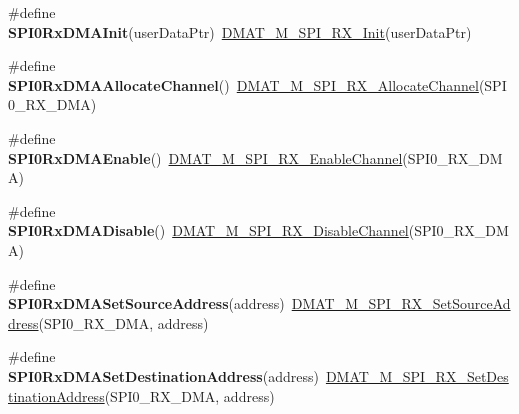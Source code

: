 \begin{DoxyCompactItemize}
\item 
\hypertarget{group___func_ala_gae401f088b3d05a165441ed135989a7ac}{\#define {\bfseries S\-P\-I0\-Rx\-D\-M\-A\-Init}(user\-Data\-Ptr)~\hyperlink{group___d_m_a_t___m___s_p_i___r_x__module_gae1749563cbec6c79815508b3c37ba827}{D\-M\-A\-T\-\_\-\-M\-\_\-\-S\-P\-I\-\_\-\-R\-X\-\_\-\-Init}(user\-Data\-Ptr)}\label{group___func_ala_gae401f088b3d05a165441ed135989a7ac}

\item 
\hypertarget{group___func_ala_gad314839d14b157f6bfe18c20bd9b6ee5}{\#define {\bfseries S\-P\-I0\-Rx\-D\-M\-A\-Allocate\-Channel}()~\hyperlink{group___d_m_a_t___m___s_p_i___r_x__module_ga94c354d7c7c0b56a1aed784fcb0e3d77}{D\-M\-A\-T\-\_\-\-M\-\_\-\-S\-P\-I\-\_\-\-R\-X\-\_\-\-Allocate\-Channel}(S\-P\-I0\-\_\-\-R\-X\-\_\-\-D\-M\-A)}\label{group___func_ala_gad314839d14b157f6bfe18c20bd9b6ee5}

\item 
\hypertarget{group___func_ala_gab32e02a52a5a9bf1bfa62dc8de40ed0e}{\#define {\bfseries S\-P\-I0\-Rx\-D\-M\-A\-Enable}()~\hyperlink{group___d_m_a_t___m___s_p_i___r_x__module_gafc57e74b4003c05c870480ab0c3a8432}{D\-M\-A\-T\-\_\-\-M\-\_\-\-S\-P\-I\-\_\-\-R\-X\-\_\-\-Enable\-Channel}(S\-P\-I0\-\_\-\-R\-X\-\_\-\-D\-M\-A)}\label{group___func_ala_gab32e02a52a5a9bf1bfa62dc8de40ed0e}

\item 
\hypertarget{group___func_ala_ga8cdf69e7e5f8189291ca4ce68e8245ee}{\#define {\bfseries S\-P\-I0\-Rx\-D\-M\-A\-Disable}()~\hyperlink{group___d_m_a_t___m___s_p_i___r_x__module_ga9b4e1d431dc3f67f2e9e4a52486ba2f2}{D\-M\-A\-T\-\_\-\-M\-\_\-\-S\-P\-I\-\_\-\-R\-X\-\_\-\-Disable\-Channel}(S\-P\-I0\-\_\-\-R\-X\-\_\-\-D\-M\-A)}\label{group___func_ala_ga8cdf69e7e5f8189291ca4ce68e8245ee}

\item 
\hypertarget{group___func_ala_gaaafb4a3444e3aaa6e8b6fb00493401bc}{\#define {\bfseries S\-P\-I0\-Rx\-D\-M\-A\-Set\-Source\-Address}(address)~\hyperlink{group___d_m_a_t___m___s_p_i___r_x__module_gae7eb2ac56c2a0231dc8509c53c2a8d0b}{D\-M\-A\-T\-\_\-\-M\-\_\-\-S\-P\-I\-\_\-\-R\-X\-\_\-\-Set\-Source\-Address}(S\-P\-I0\-\_\-\-R\-X\-\_\-\-D\-M\-A, address)}\label{group___func_ala_gaaafb4a3444e3aaa6e8b6fb00493401bc}

\item 
\hypertarget{group___func_ala_ga8ba642849aba5dcda7692cf62aa00598}{\#define {\bfseries S\-P\-I0\-Rx\-D\-M\-A\-Set\-Destination\-Address}(address)~\hyperlink{group___d_m_a_t___m___s_p_i___r_x__module_ga902c844d7c70f4c7d494f83e65f58cd2}{D\-M\-A\-T\-\_\-\-M\-\_\-\-S\-P\-I\-\_\-\-R\-X\-\_\-\-Set\-Destination\-Address}(S\-P\-I0\-\_\-\-R\-X\-\_\-\-D\-M\-A, address)}\label{group___func_ala_ga8ba642849aba5dcda7692cf62aa00598}


\end{DoxyCompactItemize}
